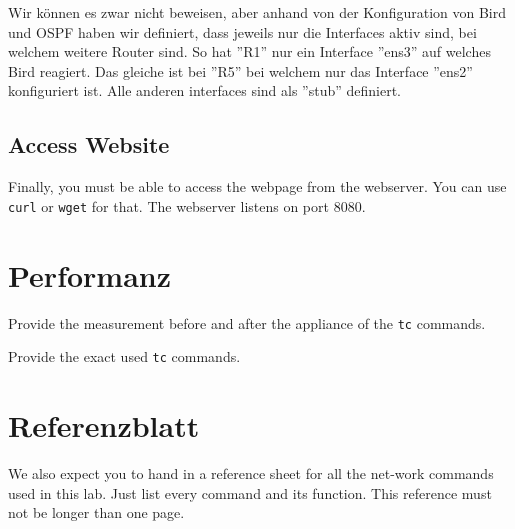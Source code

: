 \documentclass[11pt,titlepage]{article}
\newenvironment{shadedquotation}
 {\begin{shaded*}
  \quoting[leftmargin=0pt, vskip=0pt]
 }
 {\endquoting
 \end{shaded*}
}
\begin{document}
\medskip

Wir können es zwar nicht beweisen, aber anhand von der Konfiguration von Bird und OSPF haben wir definiert, dass jeweils nur die Interfaces aktiv sind, bei welchem weitere Router sind. So hat ''R1'' nur ein Interface ''ens3'' auf welches Bird reagiert. Das gleiche ist bei ''R5'' bei welchem nur das Interface ''ens2'' konfiguriert ist. Alle anderen interfaces sind als ''stub'' definiert.

\subsection{Access Website}
\label{subsec:AccessWebsite}
\begin{shadedquotation}
  Finally, you must be able to access the webpage from the webserver. You can use \lstinline!curl! or \lstinline!wget! for that. The webserver listens on port 8080.
\end{shadedquotation}

\section{Performanz}
\label{sec:Performanz}
\begin{shadedquotation}
  Provide the measurement before and after the appliance of the \lstinline!tc! commands.
  
  Provide the exact used \lstinline!tc! commands.
\end{shadedquotation}

\section{Referenzblatt}
\label{sec:Referenzblatt}
\begin{shadedquotation}
  We also expect you to hand in a reference sheet for all the net-work commands used in this lab. Just list every command and its function. This reference must not be longer than one page.
\end{shadedquotation}

\par\medskip 
\end{document}
